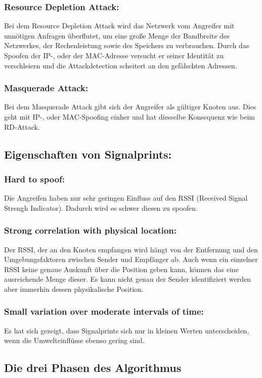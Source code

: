 \documentclass[12pt,a4paper]{article}
\begin{document}
	\subsubsection*{Resource Depletion Attack:}
		Bei dem Resource Depletion Attack wird das Netzwerk vom Angreifer mit unnötigen Anfragen überflutet, um eine große Menge der Bandbreite des Netzwerkes, der Rechenleistung sowie des Speichers zu verbrauchen. Durch das Spoofen der IP-, oder der MAC-Adresse versucht er seiner Identität zu verschleiern und die Attackdetection scheitert an den gefälschten Adressen.
	\subsubsection*{Masquerade Attack:}
		Bei dem Masquerade Attack gibt sich der Angreifer als gültiger Knoten aus. Dies geht mit IP-, oder MAC-Spoofing einher und hat diesselbe Konsequenz wie beim RD-Attack.

\subsection*{Eigenschaften von Signalprints:}
	\subsubsection*{Hard to spoof:}
		Die Angreifen haben nur sehr geringen Einfluss auf den RSSI (Received Signal Strengh Indicator). Dadurch wird es schwer diesen zu spoofen. 
	\subsubsection*{Strong correlation with physical location:}
		Der RSSI, der an den Knoten empfangen wird hängt von der Entfernung und den Umgebungsfaktoren zwischen Sender und Empfänger ab. Auch wenn ein einzelner RSSI keine genaue Auskunft über die Position geben kann, können das eine ausreichende Menge dieser. Es kann nicht genau der Sender identifiziert werden aber immerhin dessen physikalische Position.
	\subsubsection*{Small variation over moderate intervals of time:}
		Es hat sich gezeigt, dass Signalprints sich nur in kleinen Werten unterscheiden, wenn die Umwelteinflüsse ebenso gering sind.

\subsection*{Die drei Phasen des Algorithmus}
\end{document}
